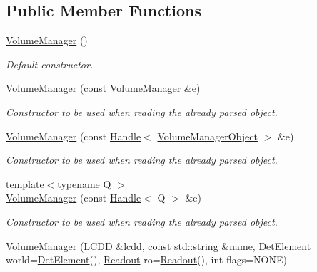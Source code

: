 \subsection*{Public Member Functions}
\begin{DoxyCompactItemize}
\item 
\hyperlink{class_d_d4hep_1_1_geometry_1_1_volume_manager_a5dc0919df1764151f01b9c026f957a5b}{VolumeManager} ()
\begin{DoxyCompactList}\small\item\em Default constructor. \item\end{DoxyCompactList}\item 
\hyperlink{class_d_d4hep_1_1_geometry_1_1_volume_manager_aea6772fb6a92c17765eb90c3362f59b6}{VolumeManager} (const \hyperlink{class_d_d4hep_1_1_geometry_1_1_volume_manager}{VolumeManager} \&e)
\begin{DoxyCompactList}\small\item\em Constructor to be used when reading the already parsed object. \item\end{DoxyCompactList}\item 
\hyperlink{class_d_d4hep_1_1_geometry_1_1_volume_manager_abb2a930f5dbb6da83d03a6b17f81d3ee}{VolumeManager} (const \hyperlink{class_d_d4hep_1_1_handle}{Handle}$<$ \hyperlink{class_d_d4hep_1_1_geometry_1_1_volume_manager_object}{VolumeManagerObject} $>$ \&e)
\begin{DoxyCompactList}\small\item\em Constructor to be used when reading the already parsed object. \item\end{DoxyCompactList}\item 
{\footnotesize template$<$typename Q $>$ }\\\hyperlink{class_d_d4hep_1_1_geometry_1_1_volume_manager_a859915ea833af0e215a307c57f6b419d}{VolumeManager} (const \hyperlink{class_d_d4hep_1_1_handle}{Handle}$<$ Q $>$ \&e)
\begin{DoxyCompactList}\small\item\em Constructor to be used when reading the already parsed object. \item\end{DoxyCompactList}\item 
\hyperlink{class_d_d4hep_1_1_geometry_1_1_volume_manager_a58b19b490cdb4d064b13c3f83e9df214}{VolumeManager} (\hyperlink{class_d_d4hep_1_1_geometry_1_1_l_c_d_d}{LCDD} \&lcdd, const std::string \&name, \hyperlink{class_d_d4hep_1_1_geometry_1_1_det_element}{DetElement} world=\hyperlink{class_d_d4hep_1_1_geometry_1_1_det_element}{DetElement}(), \hyperlink{class_d_d4hep_1_1_geometry_1_1_readout}{Readout} ro=\hyperlink{class_d_d4hep_1_1_geometry_1_1_readout}{Readout}(), int flags=NONE)

\end{DoxyCompactItemize}
